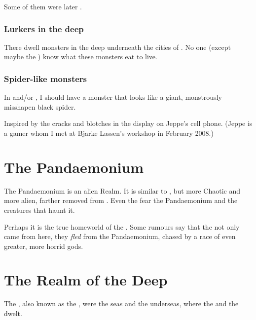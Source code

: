 Some of them were later . 





\subsubsection{Lurkers in the deep}
There dwell monsters in the deep underneath the cities of \Nyx. 
No one (except maybe the ) know what these monsters eat to live. 





\subsubsection{Spider-like monsters}
In \Nyx{} and/or \Erebos, I should have a monster that looks like a giant, monstrously misshapen black spider. 

Inspired by the cracks and blotches in the display on Jeppe's cell phone. (Jeppe is a gamer whom I met at Bjarke Lassen's workshop in February 2008.) 
















\section{The Pandaemonium}
The Pandaemonium is an alien Realm. 
It is similar to \Machai, but more Chaotic and more alien, farther removed from \Miith{}. 
Even the \dragons{} fear the Pandaemonium and the creatures that haunt it. 

Perhaps it is the true homeworld of the \xss. 
Some rumours say that the \xss{} not only came from here, they \emph{fled} from the Pandaemonium, chased by a race of even greater, more horrid gods. 















\section{The Realm of the Deep}
The , also known as the , were the seas and the underseas, where the \nagalords{} and the \nagae{} dwelt.

